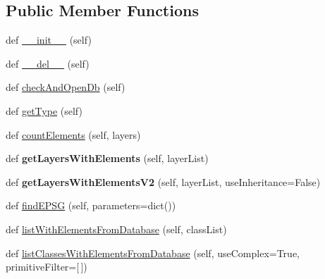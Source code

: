 \subsection*{Public Member Functions}
\begin{DoxyCompactItemize}
\item 
def \mbox{\hyperlink{class_dsg_tools_1_1_factories_1_1_db_factory_1_1abstract_db_1_1_abstract_db_ac62adde2d8d06839d98a83c4a748f00d}{\+\_\+\+\_\+init\+\_\+\+\_\+}} (self)
\item 
def \mbox{\hyperlink{class_dsg_tools_1_1_factories_1_1_db_factory_1_1abstract_db_1_1_abstract_db_a179385af36590841f11e0be5067965dd}{\+\_\+\+\_\+del\+\_\+\+\_\+}} (self)
\item 
def \mbox{\hyperlink{class_dsg_tools_1_1_factories_1_1_db_factory_1_1abstract_db_1_1_abstract_db_ab522beb68a06f7e325bc10a8c0b5506d}{check\+And\+Open\+Db}} (self)
\item 
def \mbox{\hyperlink{class_dsg_tools_1_1_factories_1_1_db_factory_1_1abstract_db_1_1_abstract_db_a83c559974cbd912019bdde7a12656d32}{get\+Type}} (self)
\item 
def \mbox{\hyperlink{class_dsg_tools_1_1_factories_1_1_db_factory_1_1abstract_db_1_1_abstract_db_a4cc7881313a6c579d07c1209739856cb}{count\+Elements}} (self, layers)
\item 
\mbox{\label{class_dsg_tools_1_1_factories_1_1_db_factory_1_1abstract_db_1_1_abstract_db_a8b0f76874164128ee65c3af4ab22840b}} 
def {\bfseries get\+Layers\+With\+Elements} (self, layer\+List)
\item 
\mbox{\label{class_dsg_tools_1_1_factories_1_1_db_factory_1_1abstract_db_1_1_abstract_db_a76a633d3a5c4c53895d0409ace4db86d}} 
def {\bfseries get\+Layers\+With\+Elements\+V2} (self, layer\+List, use\+Inheritance=False)
\item 
def \mbox{\hyperlink{class_dsg_tools_1_1_factories_1_1_db_factory_1_1abstract_db_1_1_abstract_db_a757b802e1e162e035b7083af89959575}{find\+E\+P\+SG}} (self, parameters=dict())
\item 
def \mbox{\hyperlink{class_dsg_tools_1_1_factories_1_1_db_factory_1_1abstract_db_1_1_abstract_db_ac6982cd90c216b936defc2ae530e41a1}{list\+With\+Elements\+From\+Database}} (self, class\+List)
\item 
def \mbox{\hyperlink{class_dsg_tools_1_1_factories_1_1_db_factory_1_1abstract_db_1_1_abstract_db_a6704c8b20fb6eba8872eaa8be66afa2c}{list\+Classes\+With\+Elements\+From\+Database}} (self, use\+Complex=True, primitive\+Filter=\mbox{[}$\,$\mbox{]})

\end{DoxyCompactItemize}
